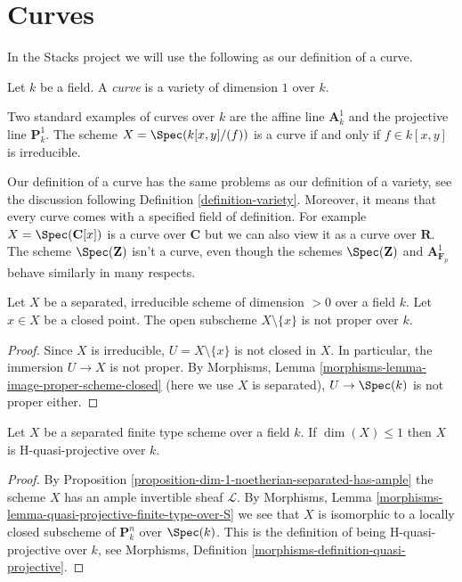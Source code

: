 \section{Curves}
\label{section-curves}

\noindent
In the Stacks project we will use the following as our definition
of a curve.

\begin{definition}
\label{definition-curve}
Let $k$ be a field. A {\it curve} is a variety of dimension $1$ over $k$.
\end{definition}

\noindent
Two standard examples of curves over $k$ are the affine line $\mathbf{A}^1_k$
and the projective line $\mathbf{P}^1_k$. The scheme $X = \Spec(k[x, y]/(f))$
is a curve if and only if $f \in k[x, y]$ is irreducible.

\medskip\noindent
Our definition of a curve has the same problems as our definition of a
variety, see the discussion following Definition \ref{definition-variety}.
Moreover, it means that every curve comes with a specified field of definition.
For example $X = \Spec(\mathbf{C}[x])$ is a curve over $\mathbf{C}$
but we can also view it as a curve over $\mathbf{R}$. The scheme
$\Spec(\mathbf{Z})$ isn't a curve, even though the schemes $\Spec(\mathbf{Z})$
and $\mathbf{A}^1_{\mathbf{F}_p}$ behave similarly in many respects.

\begin{lemma}
\label{lemma-proper-minus-point}
Let $X$ be a separated, irreducible scheme of dimension $> 0$ over a field $k$.
Let $x \in X$ be a closed point. The open subscheme $X \setminus \{x\}$
is not proper over $k$.
\end{lemma}

\begin{proof}
Since $X$ is irreducible, $U = X \setminus \{x\}$ is not closed in $X$.
In particular, the immersion $U \to X$ is not proper.
By Morphisms, Lemma \ref{morphisms-lemma-image-proper-scheme-closed}
(here we use $X$ is separated), $U \to \Spec(k)$ is not proper either.
\end{proof}

\begin{lemma}
\label{lemma-dim-1-quasi-projective}
Let $X$ be a separated finite type scheme over a field $k$.
If $\dim(X) \leq 1$ then $X$ is H-quasi-projective over $k$.
\end{lemma}

\begin{proof}
By Proposition \ref{proposition-dim-1-noetherian-separated-has-ample}
the scheme $X$ has an ample invertible sheaf $\mathcal{L}$.
By Morphisms, Lemma \ref{morphisms-lemma-quasi-projective-finite-type-over-S}
we see that $X$ is isomorphic to a locally
closed subscheme of $\mathbf{P}^n_k$ over $\Spec(k)$. This is
the definition of being H-quasi-projective over $k$, see
Morphisms, Definition \ref{morphisms-definition-quasi-projective}.
\end{proof}

